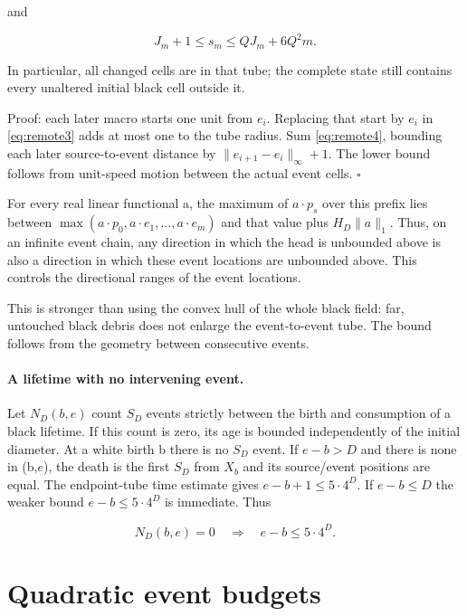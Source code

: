 \documentclass[
  11pt,
]{article}
\begin{document}
and

\begin{equation}\label{eq:remote8}
J_m+1\le s_m\le QJ_m+6Q^2m.
\end{equation}

In particular, all changed cells are in that tube; the complete state
still contains every unaltered initial black cell outside it.

Proof: each later macro starts one unit from $e_i$. Replacing that start
by $e_i$ in \eqref{eq:remote3} adds at most one to the tube radius. Sum \eqref{eq:remote4},
bounding each later source-to-event distance by
$\|e_{i+1}-e_i\|_\infty+1$. The lower bound
follows from unit-speed motion between the actual event cells.
\(\square\)

For every real linear functional a, the maximum of $a\cdot p_s$ over this
prefix lies between $\max(a\cdot p_0,a\cdot e_1,\ldots,a\cdot e_m)$ and that value plus
$H_D\|a\|_1$. Thus, on an infinite event
chain, any direction in which the head is unbounded above is also a
direction in which these event locations are unbounded above. This controls the directional ranges of the event locations.

This is stronger than using the convex hull of the whole black field:
far, untouched black debris does not enlarge the event-to-event tube. The bound follows from the geometry between consecutive events.

\paragraph{A lifetime with no intervening event.}
Let $N_D(b,e)$ count $S_D$ events strictly between the birth and consumption
of a black lifetime. If this count is zero, its age is bounded independently
of the initial diameter. At a
white birth b there is no $S_D$ event. If $e-b>D$ and there is
none in (b,\(e\)), the death is the first $S_D$ from $X_b$ and its
source/event positions are equal. The endpoint-tube time estimate gives
$e-b+1\le5\cdot4^D$. If $e-b\le D$ the weaker bound
$e-b\le5\cdot4^D$ is immediate. Thus

\begin{equation}\label{eq:circuit9}
N_D(b,e)=0\quad\Longrightarrow\quad e-b\le5\cdot4^D.
\end{equation}


\section{Quadratic event budgets}\label{quadratic-event-budgets}
\end{document}
